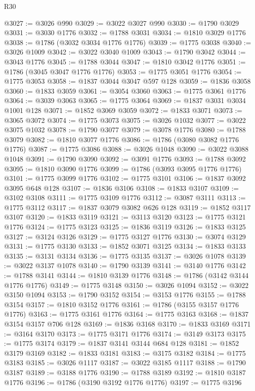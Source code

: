 \begin{lexlean}{R30}
\begin{coremodule}
{{{{{@3027 := @3026 @990
@3029 := @3022 @3027 @990
@3030 := @1790 @3029
@3031 := @3030 @1776
@3032 := @1788 @3031
@3034 := @1810 @3029 @1776
@3038 := @1786 (@3032 @3034 @1776 @1776)
@3039 := @1775 @3038
@3040 := @3026 @1009
@3042 := @3022 @3040 @1009
@3043 := @1790 @3042
@3044 := @3043 @1776
@3045 := @1788 @3044
@3047 := @1810 @3042 @1776
@3051 := @1786 (@3045 @3047 @1776 @1776)
@3053 := @1775 @3051 @1776
@3054 := @1775 @3053
@3058 := @1837 @3044 @3047 @597 @128
@3059 := @1836 @3058
@3060 := @1833 @3059
@3061 := @3054 @3060
@3063 := @1775 @3061 @1776
@3064 := @3039 @3063
@3065 := @1775 @3064
@3069 := @1837 @3031 @3034 @1001 @128
@3071 := @1852 @3069 @3059
@3072 := @1833 @3071
@3073 := @3065 @3072
@3074 := @1775 @3073
@3075 := @3026 @1032
@3077 := @3022 @3075 @1032
@3078 := @1790 @3077
@3079 := @3078 @1776
@3080 := @1788 @3079
@3082 := @1810 @3077 @1776
@3086 := @1786 (@3080 @3082 @1776 @1776)
@3087 := @1775 @3086
@3088 := @3026 @1048
@3090 := @3022 @3088 @1048
@3091 := @1790 @3090
@3092 := @3091 @1776
@3093 := @1788 @3092
@3095 := @1810 @3090 @1776
@3099 := @1786 (@3093 @3095 @1776 @1776)
@3101 := @1775 @3099 @1776
@3102 := @1775 @3101
@3106 := @1837 @3092 @3095 @648 @128
@3107 := @1836 @3106
@3108 := @1833 @3107
@3109 := @3102 @3108
@3111 := @1775 @3109 @1776
@3112 := @3087 @3111
@3113 := @1775 @3112
@3117 := @1837 @3079 @3082 @626 @128
@3119 := @1852 @3117 @3107
@3120 := @1833 @3119
@3121 := @3113 @3120
@3123 := @1775 @3121 @1776
@3124 := @1775 @3123
@3125 := @1836 @3119
@3126 := @1833 @3125
@3127 := @3124 @3126
@3129 := @1775 @3127 @1776
@3130 := @3074 @3129
@3131 := @1775 @3130
@3133 := @1852 @3071 @3125
@3134 := @1833 @3133
@3135 := @3131 @3134
@3136 := @1775 @3135
@3137 := @3026 @1078
@3139 := @3022 @3137 @1078
@3140 := @1790 @3139
@3141 := @3140 @1776
@3142 := @1788 @3141
@3144 := @1810 @3139 @1776
@3148 := @1786 (@3142 @3144 @1776 @1776)
@3149 := @1775 @3148
@3150 := @3026 @1094
@3152 := @3022 @3150 @1094
@3153 := @1790 @3152
@3154 := @3153 @1776
@3155 := @1788 @3154
@3157 := @1810 @3152 @1776
@3161 := @1786 (@3155 @3157 @1776 @1776)
@3163 := @1775 @3161 @1776
@3164 := @1775 @3163
@3168 := @1837 @3154 @3157 @706 @128
@3169 := @1836 @3168
@3170 := @1833 @3169
@3171 := @3164 @3170
@3173 := @1775 @3171 @1776
@3174 := @3149 @3173
@3175 := @1775 @3174
@3179 := @1837 @3141 @3144 @684 @128
@3181 := @1852 @3179 @3169
@3182 := @1833 @3181
@3183 := @3175 @3182
@3184 := @1775 @3183
@3185 := @3026 @1117
@3187 := @3022 @3185 @1117
@3188 := @1790 @3187
@3189 := @3188 @1776
@3190 := @1788 @3189
@3192 := @1810 @3187 @1776
@3196 := @1786 (@3190 @3192 @1776 @1776)
@3197 := @1775 @3196
}}}}}
\end{coremodule}
\end{lexlean}
